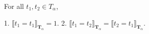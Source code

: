 For all $t_1, t_2 \in T_{\alpha}$,

1. $\llbracket t_1 = t_1 \rrbracket_{\mathbf{T}_{\alpha}} = 1$.
2. $\llbracket t_1 = t_2 \rrbracket_{\mathbf{T}_{\alpha}} = \llbracket t_2 = t_1 \rrbracket_{\mathbf{T}_{\alpha}}$.
